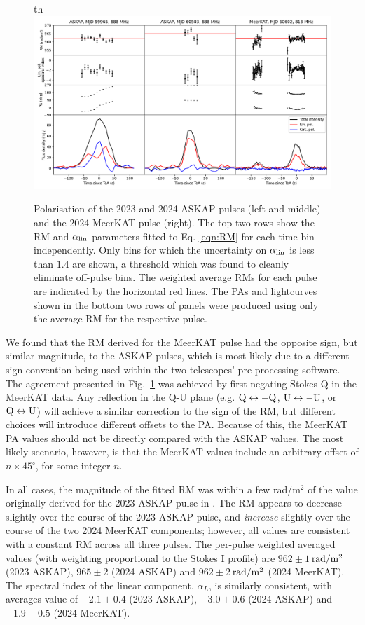 \documentclass[fleqn,usenatbib]{mnras}
\newcommand{\Fig}{Fig.}
\begin{document}
\begin{figure}{th}
    \centering
    \includegraphics[width=0.98\linewidth]{RM.pdf}
    \caption{Polarisation of the 2023 and 2024 ASKAP pulses (left and middle) and the 2024 MeerKAT pulse (right). The top two rows show the RM and $\alpha_{\rm lin}$ parameters fitted to Eq. \eqref{eqn:RM} for each time bin independently. Only bins for which the uncertainty on $\alpha_{\rm lin}$ is less than $1.4$ are shown, a threshold which was found to cleanly eliminate off-pulse bins. The weighted average RMs for each pulse are indicated by the horizontal red lines. The PAs and lightcurves shown in the bottom two rows of panels were produced using only the average RM for the respective pulse.}
    \label{fig:RM}
\end{figure}

We found that the RM derived for the MeerKAT pulse had the opposite sign, but similar magnitude, to the ASKAP pulses, which is most likely due to a different sign convention being used within the two telescopes' pre-processing software.
The agreement presented in \Fig~\ref{fig:RM} was achieved by first negating Stokes Q in the MeerKAT data.
Any reflection in the Q-U plane (e.g. ${\rm Q} \leftrightarrow -{\rm Q}$, ${\rm U} \leftrightarrow -{\rm U}$, or ${\rm Q} \leftrightarrow {\rm U}$) will achieve a similar correction to the sign of the RM, but different choices will introduce different offsets to the PA.
Because of this, the MeerKAT PA values should not be directly compared with the ASKAP values.
The most likely scenario, however, is that the MeerKAT values include an arbitrary offset of $n \times 45^\circ$, for some integer $n$.

In all cases, the magnitude of the fitted RM was within a few rad/m$^2$ of the value originally derived for the 2023 ASKAP pulse in .
The RM appears to decrease slightly over the course of the 2023 ASKAP pulse, and \emph{increase} slightly over the course of the two 2024 MeerKAT components; however, all values are consistent with a constant RM across all three pulses.
The per-pulse weighted averaged values (with weighting proportional to the Stokes I profile) are $962 \pm 1$\,${\rm rad}/{\rm m}^2$ (2023 ASKAP), $965 \pm 2$ (2024 ASKAP) and $962 \pm 2$\,${\rm rad}/{\rm m}^2$ (2024 MeerKAT).
The spectral index of the linear component, $\alpha_L$, is similarly consistent, with averages value of $-2.1 \pm 0.4$ (2023 ASKAP), $-3.0 \pm 0.6$ (2024 ASKAP) and $-1.9 \pm 0.5$ (2024 MeerKAT).
\end{document}
